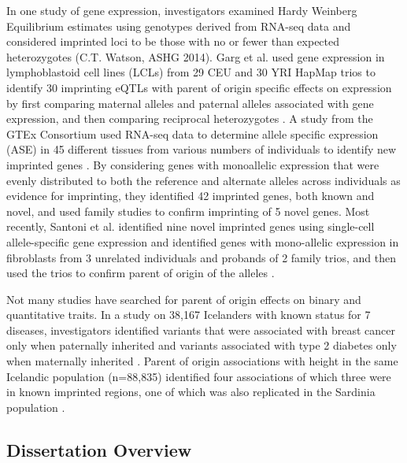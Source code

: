 In one study of gene expression, investigators examined Hardy Weinberg Equilibrium estimates using genotypes derived from RNA-seq data and considered imprinted loci to be those with no or fewer than expected heterozygotes (C.T. Watson, ASHG 2014). Garg et al. used gene expression in lymphoblastoid cell lines (LCLs) from 29 CEU and 30 YRI HapMap trios to identify 30 imprinting eQTLs with parent of origin specific effects on expression by first comparing maternal alleles and paternal alleles associated with gene expression, and then comparing reciprocal heterozygotes \cite{Garg2012a}. A study from the GTEx Consortium used RNA-seq data to determine allele specific expression (ASE) in 45 different tissues from various numbers of individuals to identify new imprinted genes \cite{Baran:2015cx}. By considering genes with monoallelic expression that were evenly distributed to both the reference and alternate alleles across individuals as evidence for imprinting, they identified 42 imprinted genes, both known and novel, and used family studies to confirm imprinting of 5 novel genes. Most recently, Santoni et al. identified nine novel imprinted genes using single-cell allele-specific gene expression and identified genes with mono-allelic expression in fibroblasts from 3 unrelated individuals and probands of 2 family trios, and then used the trios to confirm parent of origin of the alleles \cite{Santoni:2017hu}.

Not many studies have searched for parent of origin effects on binary and quantitative traits. In a study on 38,167 Icelanders with known status for 7 diseases, investigators identified variants that were associated with breast cancer only when paternally inherited and variants associated with type 2 diabetes only when maternally inherited \cite{Kong:2009kk}. Parent of origin associations with height in the same Icelandic population (n=88,835) identified four associations of which three were in known imprinted regions, one of which was also replicated in the Sardinia population \cite{Zoledziewska:2015do}.

\subsection{Dissertation Overview}


